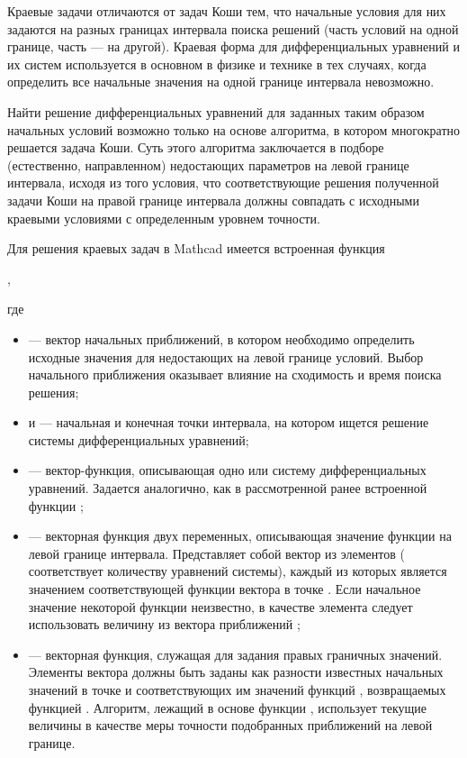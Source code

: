 Краевые задачи отличаются от задач Коши тем, что начальные условия для них задаются на разных границах интервала поиска решений (часть условий на одной границе, часть --- на другой). Краевая форма для дифференциальных уравнений и их систем используется в основном в физике и технике в тех случаях, когда определить все начальные значения на одной границе интервала невозможно. 

Найти решение дифференциальных уравнений для заданных таким образом начальных условий возможно только на основе алгоритма, в котором многократно решается задача Коши. Суть этого алгоритма заключается в подборе (естественно, направленном) недостающих параметров на левой границе интервала, исходя из того условия, что соответствующие решения полученной задачи Коши на правой границе интервала должны совпадать с исходными краевыми условиями с определенным уровнем точности.

Для решения краевых задач в Mathcad имеется встроенная функция 
\begin{center}
	,
\end{center}
где
\begin{itemize}[label={}]
	\item {} --- вектор начальных приближений, в котором необходимо определить исходные значения для недостающих на левой границе условий. Выбор начального приближения оказывает влияние на сходимость и время поиска решения;
	\item {} и  --- начальная и конечная точки интервала, на котором ищется решение системы дифференциальных уравнений;
	\item {} --- вектор-функция, описывающая одно или систему дифференциальных уравнений. Задается аналогично, как в рассмотренной ранее встроенной функции ;
	\item {} --- векторная функция двух переменных, описывающая значение функции на левой границе интервала. Представляет собой вектор из  элементов ( соответствует количеству уравнений системы), каждый из которых является значением соответствующей функции вектора  в точке . Если начальное значение некоторой функции неизвестно, в качестве элемента  следует использовать величину из вектора приближений ;
	\item {} --- векторная функция, служащая для задания правых граничных значений. Элементы вектора  должны быть заданы как разности известных начальных значений в точке  и соответствующих им значений функций , возвращаемых функцией . Алгоритм, лежащий в основе функции , использует текущие величины  в качестве меры точности подобранных приближений на левой границе. 
\end{itemize}

